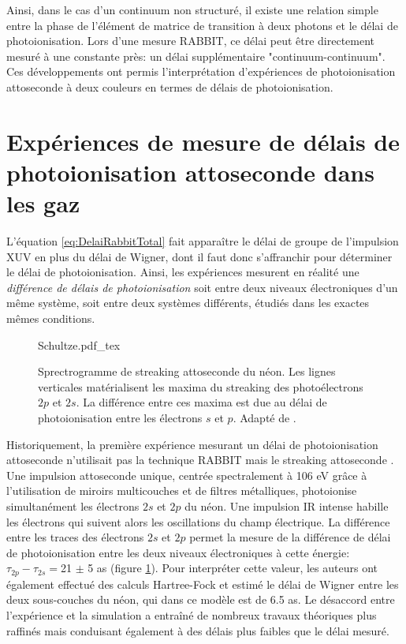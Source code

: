 Ainsi, dans le cas d'un continuum non structuré, il existe une relation simple entre la phase de l'élément de matrice de transition à deux photons et le délai de photoionisation. Lors d'une mesure RABBIT, ce délai peut être directement mesuré à une constante près: un délai supplémentaire "continuum-continuum". Ces développements ont permis l'interprétation d'expériences de photoionisation attoseconde à deux couleurs en termes de délais de photoionisation. 

\section{Expériences de mesure de délais de photoionisation attoseconde dans les gaz}
L'équation \ref{eq:DelaiRabbitTotal} fait apparaître le délai de groupe de l'impulsion XUV en plus du délai de Wigner, dont il faut donc s'affranchir pour déterminer le délai de photoionisation. Ainsi, les expériences mesurent en réalité une \textit{différence de délais de photoionisation} soit entre deux niveaux électroniques d'un même système, soit entre deux systèmes différents, étudiés dans les exactes mêmes conditions.

\begin{figure}[h]
\centering
\def\svgwidth{0.6\columnwidth}
{Schultze.pdf_tex}
\caption{Sprectrogramme de streaking attoseconde du néon. Les lignes verticales matérialisent les maxima du streaking des photoélectrons $2p$ et $2s$. La différence entre ces maxima est due au délai de photoionisation entre les électrons $s$ et $p$. Adapté de .}
\label{fig:Schultze}
\end{figure}

Historiquement, la première expérience mesurant un délai de photoionisation attoseconde n'utilisait pas la technique RABBIT mais le streaking attoseconde . Une impulsion attoseconde unique, centrée spectralement à 106 eV grâce à l'utilisation de miroirs multicouches et de filtres métalliques, photoionise simultanément les électrons $2s$ et $2p$ du néon. Une impulsion IR intense habille les électrons qui suivent alors les oscillations du champ électrique. La différence entre les traces des électrons $2s$ et $2p$ permet la mesure de la différence de délai de photoionisation entre les deux niveaux électroniques à cette énergie: $\tau_{2p} - \tau_{2s} =$21 $\pm$ 5 as (figure \ref{fig:Schultze}). Pour interpréter cette valeur, les auteurs ont également effectué des calculs Hartree-Fock et estimé le délai de Wigner entre les deux sous-couches du néon, qui dans ce modèle est de 6.5 as. Le désaccord entre l'expérience et la simulation a entraîné de nombreux travaux théoriques  plus raffinés mais conduisant également à des délais plus faibles que le délai mesuré. 

